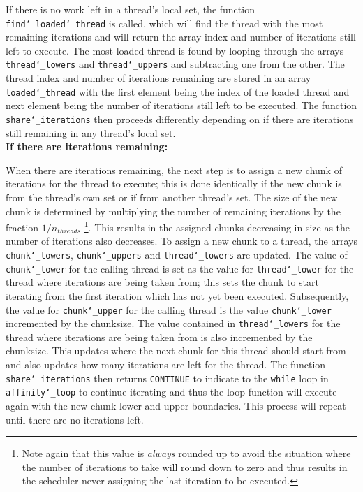 \documentclass[11pt, a4paper]{article}
\begin{document}
				If there is no work left in a thread's local set, the function \texttt{find\char`_loaded\char`_thread} is called, which will find the thread with the most remaining iterations and will return the array index and number of iterations still left to execute. The most loaded thread is found by looping through the arrays \texttt{thread\char`_lowers} and \texttt{thread\char`_uppers} and subtracting one from the other. The thread index and number of iterations remaining are stored in an array \texttt{loaded\char`_thread} with the first element being the index of the loaded thread and next element being the number of iterations still left to be executed. The function \texttt{share\char`_iterations} then proceeds differently depending on if there are iterations still remaining in any thread's local set. \\
				
				\noindent \textbf{If there are iterations remaining:}
				
				When there are iterations remaining, the next step is to assign a new chunk of iterations for the thread to execute; this is done identically if the new chunk is from the thread's own set or if from another thread's set. The size of the new chunk is determined by multiplying the number of remaining iterations by the fraction $1/n_{threads}$ \footnote{Note again that this value is \textit{always} rounded up to avoid the situation where the number of iterations to take will round down to zero and thus results in the scheduler never assigning the last iteration to be executed.}. This results in the assigned chunks decreasing in size as the number of iterations also decreases. To assign a new chunk to a thread, the arrays \texttt{chunk\char`_lowers}, \texttt{chunk\char`_uppers} and \texttt{thread\char`_lowers} are updated. The value of \texttt{chunk\char`_lower} for the calling thread is set as the value for \texttt{thread\char`_lower} for the thread where iterations are being taken from; this sets the chunk to start iterating from the first iteration which has not yet been executed. Subsequently, the value for \texttt{chunk\char`_upper} for the calling thread is the value \texttt{chunk\char`_lower} incremented by the chunksize. The value contained in \texttt{thread\char`_lowers} for the thread where iterations are being taken from is also incremented by the chunksize. This updates where the next chunk for this thread should start from and also updates how many iterations are left for the thread. The function \texttt{share\char`_iterations} then returns \texttt{CONTINUE} to indicate to the \texttt{while} loop in \texttt{affinity\char`_loop} to continue iterating and thus the loop function will execute again with the new chunk lower and upper boundaries. This process will repeat until there are no iterations left.\\
			
\end{document}
